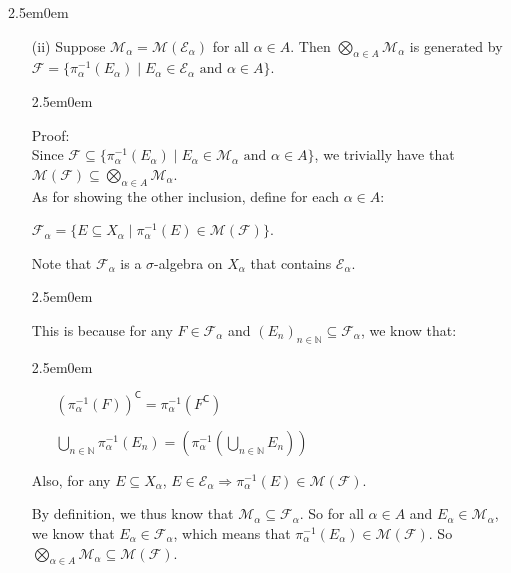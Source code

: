 \documentclass{book}
\newcommand{\hThree}{%
   \color{PineGreen!85!Orange}
   \fontsize{12}{14}\selectfont%
}
\newcommand{\hFour}{%
   \color{Cyan!80!black}
   \fontsize{12}{14}\selectfont%
}
\newenvironment{myIndent}{%
   \begin{adjustwidth}{2.5em}{0em}%
}{%
   \end{adjustwidth}%
}
\newcommand{\comp}{\mathsf{C}}
\newcommand{\retTwo}{\hfill\bigbreak}
\begin{document}
\begin{myIndent}
\begin{itemize}
      \item[(ii)] Suppose $\mathcal{M}_\alpha = \mathcal{M}(\mathcal{E}_\alpha)$ for all $\alpha \in A$. Then $\bigotimes\limits_{\alpha \in A}\mathcal{M}_\alpha$ is generated by\\ [-8pt] $\mathcal{F} = \{\pi^{-1}_\alpha(E_\alpha) \mid E_\alpha \in \mathcal{E}_\alpha \text{ and } \alpha \in A\}$.
      
      \begin{myIndent}\hThree
         Proof:\\
         Since $\mathcal{F} \subseteq \{\pi_\alpha^{-1}(E_\alpha) \mid E_\alpha \in \mathcal{M}_\alpha \text{ and } \alpha \in A\}$, we trivially have that\\ $\mathcal{M}(\mathcal{F}) \subseteq \bigotimes\limits_{\alpha \in A} \mathcal{M}_\alpha$.\\ [-2pt]

         As for showing the other inclusion, define for each $\alpha \in A$:

         {\centering$\mathcal{F}_\alpha = \{E \subseteq X_\alpha \mid \pi_\alpha^{-1}(E) \in \mathcal{M}(\mathcal{F})\}$.\retTwo\par}

         Note that $\mathcal{F}_\alpha$ is a $\sigma$-algebra on $X_\alpha$ that contains $\mathcal{E}_\alpha$.
         \begin{myIndent}\hFour
            This is because for any $F \in \mathcal{F}_\alpha$ and $(E_n)_{n \in \mathbb{N}} \subseteq \mathcal{F}_\alpha$, we know that:
            \begin{myIndent}
               \begin{itemize}
                  \item[\bullet] $\left(\pi_{\alpha}^{-1}(F)\right)^\comp = \pi_{\alpha}^{-1}(F^\comp)$
                  \item[\bullet] $\bigcup\limits_{n \in \mathbb{N}}\pi_{\alpha}^{-1}(E_n) = \left(\pi_{\alpha}^{-1}(\bigcup\limits_{n \in \mathbb{N}}E_n)\right)$\retTwo
               \end{itemize}
            \end{myIndent}

            Also, for any $E \subseteq X_\alpha$, $E \in \mathcal{E}_\alpha \Longrightarrow \pi_\alpha^{-1}(E) \in \mathcal{M}(\mathcal{F})$.\retTwo
         \end{myIndent}

         By definition, we thus know that $\mathcal{M}_\alpha \subseteq \mathcal{F}_\alpha$. So for all $\alpha \in A$ and $E_\alpha \in \mathcal{M}_\alpha$, we know that $E_\alpha \in \mathcal{F}_\alpha$, which means that $\pi_\alpha^{-1}(E_\alpha) \in \mathcal{M}(\mathcal{F})$. So\\ $\bigotimes\limits_{\alpha \in A} \mathcal{M}_\alpha \subseteq \mathcal{M}(\mathcal{F})$.\retTwo
      \end{myIndent}


\end{itemize}
\end{myIndent}
\end{document}
